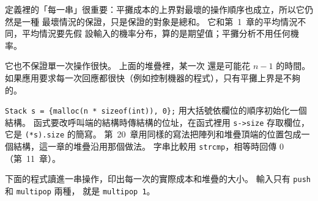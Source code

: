 定義裡的「每一串」很重要：平攤成本的上界對最壞的操作順序也成立，所以它仍然是一種
最壞情況的保證，只是保證的對象是總和。 它和第~1~章的平均情況不同，平均情況要先假
設輸入的機率分布，算的是期望值；平攤分析不用任何機率。

它也不保證單一次操作很快。 上面的堆疊裡，某一次  還是可能花 $n - 1$
的時間。 如果應用要求每一次回應都很快（例如控制機器的程式），只有平攤上界是不夠的。

\begin{cbookrecap}[第~14~章 14.5 節、第~20~章 20.8 節]
\texttt{Stack s = \{malloc(n * sizeof(int)), 0\};} 用大括號依欄位的順序初始化一個
結構。 函式要改呼叫端的結構時傳結構的位址，在函式裡用 \texttt{s->size} 存取欄位，
它是 \texttt{(*s).size} 的簡寫。 第~20~章用同樣的寫法把陣列和堆疊頂端的位置包成一
個結構，這一章的堆疊沿用那個做法。 字串比較用 \texttt{strcmp}，相等時回傳 $0$
（第~11~章）。
\end{cbookrecap}

下面的程式讀進一串操作，印出每一次的實際成本和堆疊的大小。 輸入只有
\texttt{push} 和 \texttt{multipop} 兩種， 就是 \texttt{multipop 1}。

